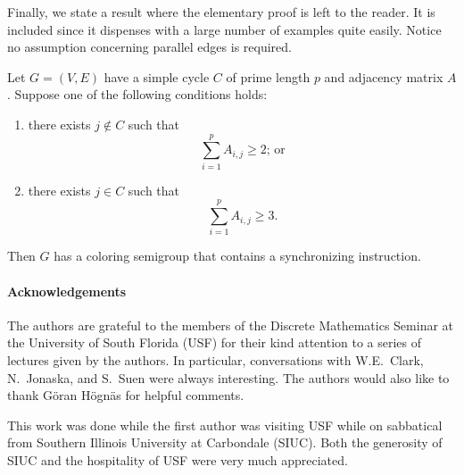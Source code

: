 Finally, we state a result where the elementary proof is left to the reader.
It is included since it dispenses with a large number of examples quite easily. Notice no assumption concerning parallel edges is required.

\begin{theorem}		\label{thm:4.11}
Let $G=(V,E)$ have a simple cycle $C$ of prime length $p$ and adjacency
matrix $A$. 
Suppose one of the following conditions holds:
%
\begin{enumerate}
\item[{\normalfont(1)}]  there exists $j\notin C$ such that
\[
  \sum_{i=1}^p A_{i,j}\ge 2\text{; or}
\]

\item[{\normalfont(2)}]  there exists $j\in C$ such that
\[
  \sum_{i=1}^p A_{i,j}\ge 3.
\]
\end{enumerate}
%
Then $G$ has a coloring semigroup that contains a synchronizing instruction.
\end{theorem}

\paragraph{Acknowledgements}

The authors are grateful to the members of the Discrete Mathematics Seminar at the University of South Florida (USF) for their kind attention to a series of lectures given 
by the authors.  
In particular, conversations with W.E.\ Clark, N.\ Jonaska, and S.\ Suen were always interesting.  
The authors would  also like to thank G\"oran H\"ogn\"as for helpful comments.

This work was done while the first author was visiting USF while on sabbatical from Southern Illinois University at Carbondale (SIUC).
Both the generosity of SIUC and the hospitality of USF were very much appreciated. 
